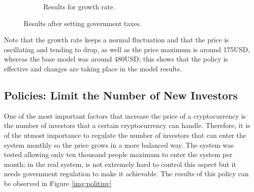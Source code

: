 \begin{figure}[H]
\begin{subfigure}[t]{0.4\textwidth}
        \centering
        \caption{Results for growth rate.}
      \end{subfigure}
      \caption{Results after setting government taxes.}
      \label{img:polittaxes}
	\end{figure}
   Note that the growth rate keeps a normal fluctuation and that the price is oscillating and tending to drop, as well as the price maximum is around 175USD, whereas the base model was around 480USD; this shows that the policy is effective and changes are taking place in the model results.
   
   
   \subsection{Policies: Limit the Number of New Investors}
   One of the most important factors that increase the price of a cryptocurrency is the number of investors that a certain cryptocurrency can handle. Therefore, it is of the utmost importance to regulate the number of investors that can enter the system monthly so the price grows in a more balanced way. The system was tested allowing only ten thousand people maximum to enter the system per month; in the real system, is not extremely hard to control this aspect but it needs government regulation to make it achievable. The results of this policy can be observed in Figure \ref{img:politinv}
   

